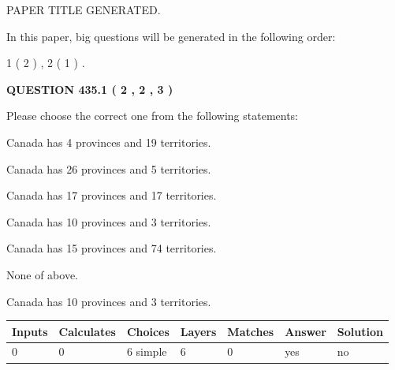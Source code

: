\documentclass[12pt]{article}
\begin{document}
 
 
 
   
   
 PAPER TITLE GENERATED.
   
   
   
\vspace{0.2in}
   
In this paper, big questions will be generated in the following order: 
   
   
   1 ( 2 )
 ,
   2 ( 1 )
 .
  
\vspace{0.2in}
  
{\textbf{\Large{QUESTION
435.1 
 ( 2 , 2 , 3 )
}}}
  
  
Please choose the correct one from the following statements:
 
 
Canada has   4 provinces and  19 territories.
 
 
Canada has  26 provinces and  5 territories.
 
 
Canada has  17 provinces and  17 territories.
 
 
Canada has 10  provinces and 3 territories.
 
 
Canada has  15 provinces and  74 territories.
 
 
 None of above.
 
 
\noindent{}
 
 
Canada has 10  provinces and 3 territories.
 
 
\noindent{}
 
 
   
   
   
   
\noindent\begin{tabular}{|l|l|l|l|l|l|l|}
 \hline
Inputs & Calculates & Choices & Layers & Matches & Answer & Solution \\ \hline
 0  & 
 0  & 
 6
  simple  
  & 
 6  & 
 0  & 
  yes & 
  no 
  \\ \hline
 \end{tabular}
   
   
   
   
\noindent{}
   
\end{document}
